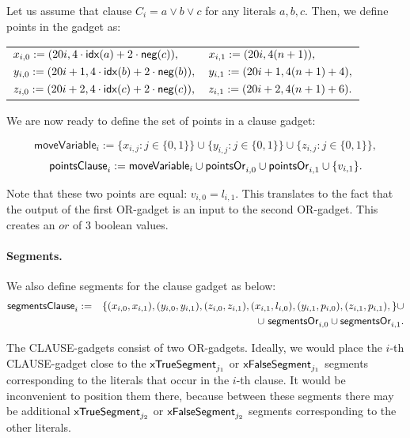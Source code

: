 Let us assume that clause $C_i = a \lor b \lor c$
for any literals $a,b,c$. Then, we define points in the gadget as:

\begin{center}
\begin{tabular}{ l l }
	$x_{i, 0} := (20 i, 4\cdot \mathsf{idx}(a) + 2\cdot \mathsf{neg}(c)),$ &
	$x_{i, 1} := (20 i, 4(n+1)),$ \\
	$y_{i, 0} := (20 i+1, 4\cdot \mathsf{idx}(b) + 2\cdot \mathsf{neg}(b)),$ &
	$y_{i, 1} := (20 i+1, 4(n+1) + 4),$ \\
	$z_{i, 0} := (20 i+2, 4\cdot \mathsf{idx}(c) + 2\cdot \mathsf{neg}(c)),$ &
	$z_{i, 1} := (20 i+2, 4(n+1) + 6).$
\end{tabular}
\end{center}

\newcommand{\segmentsClause}{\mathsf{segmentsClause}}	
 
We are now ready to define the set of points in a clause gadget:
 
 $$\mathsf{moveVariable}_i := 
 \{x_{i, j} : j \in \{0, 1\}\} \cup
 \{y_{i, j} : j \in \{0, 1\}\} \cup
 \{z_{i, j} : j \in \{0, 1\}\},
 $$
 $$\mathsf{pointsClause}_{i} := 
 \mathsf{moveVariable}_i \cup \mathsf{pointsOr}_{i,0}
 \cup \mathsf{pointsOr}_{i,1} \cup \{v_{i, 1} \}.
 $$
 
Note that these two points are equal: $v_{i,0} = l_{i,1}$.
This translates to the fact that the output of the first OR-gadget
is an input to the second OR-gadget.
This creates an $or$ of 3 boolean values.

\paragraph{Segments.}
We also define segments for the clause gadget as below:
\begin{eqnarray*}
\segmentsClause_i & := & \{ (x_{i, 0}, x_{i, 1}),
(y_{i, 0}, y_{i, 1}),
(z_{i, 0}, z_{i, 1}),
(x_{i, 1}, l_{i, 0}),
(y_{i, 1}, p_{i, 0}),
(z_{i, 1}, p_{i, 1}),
\} \cup \\
& & \cup \ \segmentsOr{i}{0} \cup \segmentsOr{i}{1}.
\end{eqnarray*}

\newcommand{\segmentsClauseSolTrue}[1]{\mathsf{solClause}^{\true,#1}}
\newcommand{\segmentsClauseSolFalse}{\mathsf{solClause}^{\false}}

The CLAUSE-gadgets consist of two OR-gadgets.
Ideally, we would place the $i$-th CLAUSE-gadget close to the
$\mathsf{xTrueSegment}_{j_1}$ or $\mathsf{xFalseSegment}_{j_1}$ segments
corresponding to the literals that occur in the $i$-th clause.
It would be inconvenient to position them there,
because between these segments there may be additional
$\mathsf{xTrueSegment}_{j_2}$ or $\mathsf{xFalseSegment}_{j_2}$
segments corresponding to the other literals.

